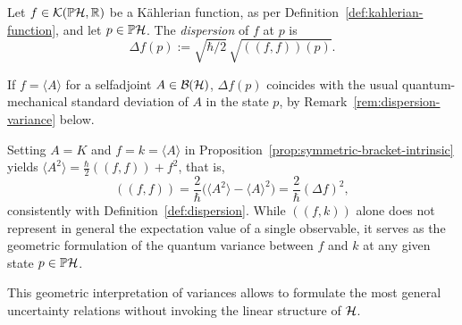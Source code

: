 \begin{definition}[Dispersion]
	\label{def:dispersion}
	Let $f\in\mathcal K(\PH,\R)$ be a Kählerian function, as per Definition~\ref{def:kahlerian-function}, and let $p\in\PH$. The \emph{dispersion} of $f$ at $p$ is
	\begin{equation}
		\Delta f(p) := \sqrt{\hbar/2}\,\sqrt{((f,f))(p)}.\label{eq:riemann-dispersion}
	\end{equation}
\end{definition}
	If $f=\langle A\rangle$ for a selfadjoint $A\in\BH$, $\Delta f(p)$ coincides with the usual quantum-mechanical standard deviation of $A$ in the state $p$, by Remark~\ref{rem:dispersion-variance} below.
\begin{remark}
	\label{rem:dispersion-variance}
	Setting $A=K$ and $f=k=\langle A\rangle$ in Proposition~\ref{prop:symmetric-bracket-intrinsic} yields $\langle A^2\rangle = \frac{\hbar}{2}((f,f))+ f^2$, that is,
	\begin{equation}
		\label{eq:riemann-bracket-variance}
		((f,f)) = \frac{2}{\hbar}\Big(\langle A^2 \rangle - \langle A \rangle^2\Big) = \frac{2}{\hbar}(\Delta f)^2,
	\end{equation}
	consistently with Definition~\ref{def:dispersion}. While $((f,k))$ alone does not represent in general the expectation value of a single observable, it serves as the geometric formulation of the quantum variance between $f$ and $k$ at any given state $p \in \PH$.
\end{remark}

This geometric interpretation of variances allows to formulate the most general uncertainty relations without invoking the linear structure of $\H$.

